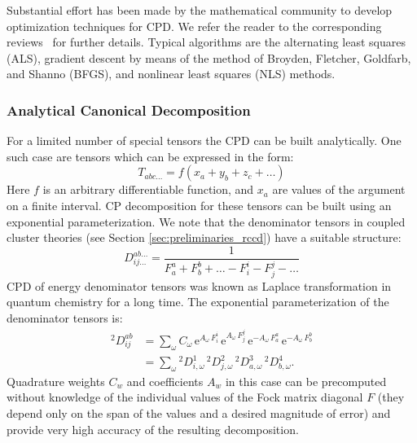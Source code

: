 Substantial effort has been made by the mathematical community to develop 
optimization techniques for CPD. We refer the reader to the corresponding 
reviews~\cite{kolda2009tensor, sidiropoulos2016tensor} for further details. 
Typical algorithms are the alternating least squares 
(ALS),\cite{comon2009tensor} gradient descent by 
means of the method of Broyden, Fletcher, Goldfarb, and Shanno 
(BFGS), and nonlinear least squares (NLS) methods.\cite{sorber2013optimization}

\subsubsection{Analytical Canonical Decomposition}
For a limited number of special tensors the CPD can be built analytically. 
One such case are tensors which can be expressed in the form:
%
\begin{equation}
T_{abc\ldots} = 
f(x_{a} + y_{b} + z_{c} + \ldots)
\end{equation}
%
Here $f$ is an arbitrary differentiable function, and $x_{a}$ are values of the 
argument on a finite interval. CP decomposition for these tensors can be 
built using an exponential parameterization.\cite{braess2005approximation} We 
note that the denominator tensors in coupled cluster theories (see Section 
\ref{sec:preliminaries_rccd}) have a suitable structure: 
%
\begin{equation}
D^{ab\ldots}_{ij\ldots} = 
\frac{1}{F_{a}^{a} + F_{b}^{b} + \ldots - F_{i}^{i} - 
F_{j}^{j} - \ldots}
\end{equation}
CPD of energy denominator tensors was known as Laplace 
transformation in quantum chemistry for a long 
time.\cite{almlof1991elimination} The exponential parameterization of the 
denominator tensors is:
%
\begin{subequations}
\begin{align} {}^2D_{ij}^{ab} &= 
\sum_{\omega} C_\omega \, \mathrm{e}^{A_\omega \,
F_i^i} \, \mathrm{e}^{A_\omega \, F_j^j} \, \mathrm{e}^{-A_\omega \,
F_a^a} \, \mathrm{e}^{-A_\omega \, F_b^b} \\ &= \sum_{\omega} {}^2D^1_{i,\omega} 
\,
{}^2D^2_{j,\omega} \, {}^2D^3_{a,\omega} \, {}^2D^4_{b,\omega}.
\end{align}
\end{subequations}
%
Quadrature weights $C_{w}$ and coefficients $A_{w}$ in this case can be 
precomputed without knowledge of the individual values of the Fock matrix 
diagonal $F$ (they depend only on the span of the values and a desired 
magnitude of error) and provide very high accuracy of the resulting 
decomposition.\cite{braess2005approximation}
%
